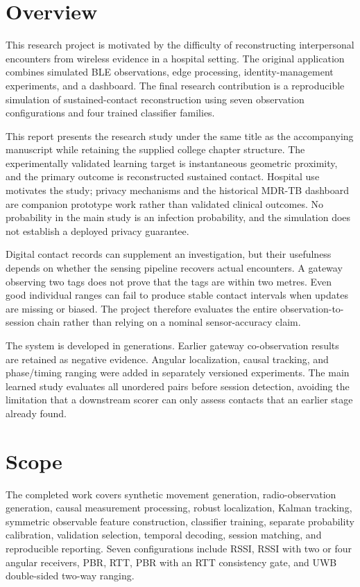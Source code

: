 \documentclass[12pt,a4paper]{report}
\begin{document}
\section{Overview}
This research project is motivated by the difficulty of reconstructing interpersonal encounters from wireless evidence in a hospital setting. The original application combines simulated BLE observations, edge processing, identity-management experiments, and a dashboard. The final research contribution is a reproducible simulation of sustained-contact reconstruction using seven observation configurations and four trained classifier families.

This report presents the research study under the same title as the accompanying manuscript while retaining the supplied college chapter structure. The experimentally validated learning target is instantaneous geometric proximity, and the primary outcome is reconstructed sustained contact. Hospital use motivates the study; privacy mechanisms and the historical MDR-TB dashboard are companion prototype work rather than validated clinical outcomes. No probability in the main study is an infection probability, and the simulation does not establish a deployed privacy guarantee.

Digital contact records can supplement an investigation, but their usefulness depends on whether the sensing pipeline recovers actual encounters. A gateway observing two tags does not prove that the tags are within two metres. Even good individual ranges can fail to produce stable contact intervals when updates are missing or biased. The project therefore evaluates the entire observation-to-session chain rather than relying on a nominal sensor-accuracy claim.

The system is developed in generations. Earlier gateway co-observation results are retained as negative evidence. Angular localization, causal tracking, and phase/timing ranging were added in separately versioned experiments. The main learned study evaluates all unordered pairs before session detection, avoiding the limitation that a downstream scorer can only assess contacts that an earlier stage already found.

\section{Scope}
The completed work covers synthetic movement generation, radio-observation generation, causal measurement processing, robust localization, Kalman tracking, symmetric observable feature construction, classifier training, separate probability calibration, validation selection, temporal decoding, session matching, and reproducible reporting. Seven configurations include RSSI, RSSI with two or four angular receivers, PBR, RTT, PBR with an RTT consistency gate, and UWB double-sided two-way ranging.
\end{document}
